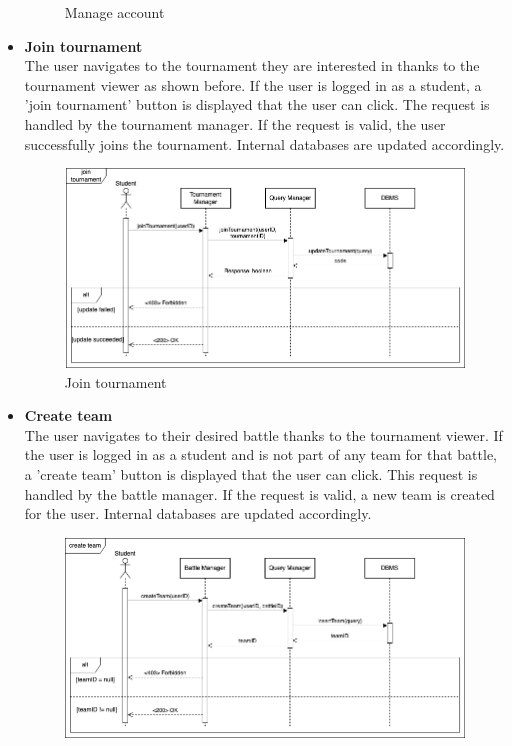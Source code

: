 \begin{itemize}
\begin{figure}[h]
        \caption{Manage account}
        \label{fig:Manage account}
    \end{figure}
    \newpage
    \item \textbf{Join tournament}\\
    The user navigates to the tournament they are interested in thanks to the tournament viewer as shown before. If the user is logged in as a student, a 'join tournament' button is displayed that the user can click. The request is handled by the tournament manager. If the request is valid, the user successfully joins the tournament. Internal databases are updated accordingly.
    \begin{figure}[h]
        \centering
        \includegraphics[width=1\linewidth]{src/Join tournament.png}
        \caption{Join tournament}
        \label{fig:Join tournament}
    \end{figure}
    \newpage
    \item \textbf{Create team}\\
    The user navigates to their desired battle thanks to the tournament viewer. If the user is logged in as a student and is not part of any team for that battle, a 'create team' 
    button is displayed that the user can click. This request is handled by the battle manager. If the request is valid, a new team is created for the user. Internal databases are 
    updated accordingly.
    \begin{figure}[h]
        \centering
        \includegraphics[width=1\linewidth]{src/Create team.png}

\end{figure}
\end{itemize}
